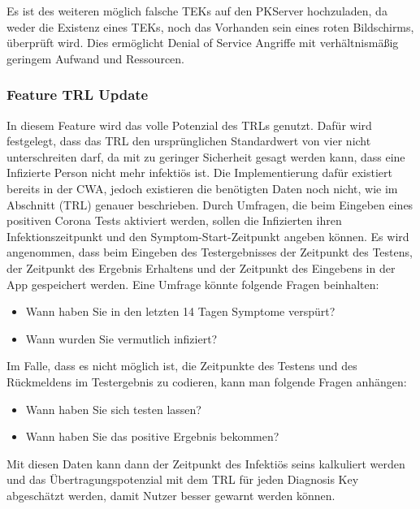 \documentclass[conference]{IEEEtran}
\begin{document}
Es ist des weiteren möglich falsche TEKs auf den PKServer hochzuladen, da weder die Existenz eines TEKs, noch das Vorhanden sein eines roten Bildschirms, überprüft wird.
Dies ermöglicht Denial of Service Angriffe mit verhältnismäßig geringem Aufwand und Ressourcen.\\


\subsubsection{Feature TRL Update}
In diesem Feature wird das volle Potenzial des TRLs genutzt. Dafür wird festgelegt, dass das TRL den ursprünglichen Standardwert von vier nicht unterschreiten darf, da mit zu geringer Sicherheit gesagt werden kann, dass eine Infizierte Person nicht mehr infektiös ist. Die Implementierung dafür existiert bereits in der CWA, jedoch existieren die benötigten Daten noch nicht, wie im Abschnitt (TRL) genauer beschrieben. Durch Umfragen, die beim Eingeben eines positiven Corona Tests aktiviert werden, sollen die Infizierten ihren Infektionszeitpunkt und den Symptom-Start-Zeitpunkt angeben können. Es wird angenommen, dass beim Eingeben des Testergebnisses der Zeitpunkt des Testens, der Zeitpunkt des Ergebnis Erhaltens und der Zeitpunkt des Eingebens in der App gespeichert werden. Eine Umfrage könnte folgende Fragen beinhalten:

\begin{itemize}
	\item Wann haben Sie in den letzten 14 Tagen Symptome verspürt?
	\item Wann wurden Sie vermutlich infiziert?
\end{itemize}

Im Falle, dass es nicht möglich ist, die Zeitpunkte des Testens und  des Rückmeldens im Testergebnis zu codieren, kann man folgende Fragen anhängen:

\begin{itemize}
	\item Wann haben Sie sich testen lassen?
	\item Wann haben Sie das positive Ergebnis bekommen?
\end{itemize} 
	
Mit diesen Daten kann dann der Zeitpunkt des Infektiös seins kalkuliert werden und das Übertragungspotenzial mit dem TRL für jeden Diagnosis Key abgeschätzt werden, damit Nutzer besser gewarnt werden können.\\
\end{document}
